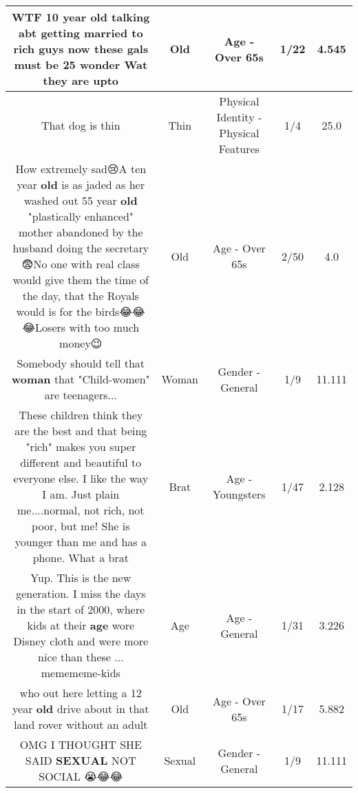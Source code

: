 \documentclass[11pt]{article}
\newlength\mylength
\begin{document}
\begin{center}
\begin{longtable}{|C{.65\mylength}|C{.30\mylength}|C{.12\mylength}|C{.12\mylength}|C{.12\mylength}|}
  \small WTF 10 year \textbf{old} talking abt getting married to rich guys now these gals must be 25 wonder Wat they are upto\normalsize   & Old & Age - Over 65s & 1/22 & 4.545 \\  \hline
  \small That dog is thin\normalsize   & Thin & Physical Identity - Physical Features & 1/4 & 25.0 \\  \hline
  \small How extremely sad😢A ten year \textbf{old} is as jaded as her washed out 55 year \textbf{old} "plastically enhanced" mother abandoned by the husband doing the secretary😨No one with real class would give them the time of the day, that the Royals would is for the birds😂😂😂Losers with too much money😉\normalsize   & Old & Age - Over 65s & 2/50 & 4.0 \\  \hline
  \small Somebody should tell that \textbf{woman} that "Child-women" are teenagers...\normalsize   & Woman & Gender - General & 1/9 & 11.111 \\  \hline
  \small These children think they are the best and that being "rich" makes you super different and beautiful to everyone else. I like the way I am. Just plain me....normal, not rich, not poor, but me! She is younger than me and has a phone. What a brat\normalsize   & Brat & Age - Youngsters & 1/47 & 2.128 \\  \hline
  \small Yup. This is the new generation. I miss the days in the start of 2000, where kids at their \textbf{age} wore Disney cloth and were more nice than these ... memememe-kids\normalsize   & Age & Age - General & 1/31 & 3.226 \\  \hline
  \small who out here letting a 12 year \textbf{old} drive about in that land rover without an adult\normalsize   & Old & Age - Over 65s & 1/17 & 5.882 \\  \hline
  \small OMG I THOUGHT SHE SAID \textbf{SEXUAL} NOT SOCIAL 😭😂😂\normalsize   & Sexual & Gender - General & 1/9 & 11.111 \\  \hline

\end{longtable}
\end{center}
\end{document}
